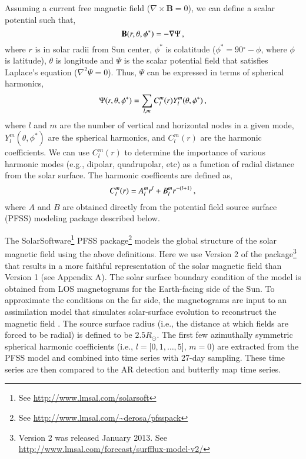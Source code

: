 \documentclass[namedreferences]{solarphysics}
\newcommand{\degr}{\ensuremath{^\circ}}
\begin{document}
\begin{article}
Assuming a current free magnetic field ($\nabla\times\mathbf{B}=0$), we can define a scalar potential such that,
\begin{equation}
\mathbf{B}(r,\theta,\phi^*)=-\nabla \Psi \mbox{\,,}
\end{equation}
where $r$ is in solar radii from Sun center, $\phi^*$ is colatitude ($\phi^*=90\degr-\phi$, where $\phi$ is latitude), $\theta$ is longitude and $\Psi$ is the scalar potential field 
that satisfies Laplace's equation ($\nabla^2 \Psi = 0$). Thus, $\Psi$ can be expressed in terms of spherical harmonics,
\begin{equation}\label{eqn_harm_coeff}
\Psi(r,\theta,\phi^*)=\sum_{l,m}C_{l}^{m}(r)Y_{l}^{m}(\theta,\phi^*) \mbox{\,,}
\end{equation}
where $l$ and $m$ are the number of vertical and horizontal nodes in a given mode, $Y_{l}^{m}(\theta,\phi^*)$ are the spherical harmonics, and $C_{l}^{m}(r)$ are the harmonic coefficients. We can use $C_{l}^{m}(r)$ to determine the importance of various harmonic modes (e.g., dipolar, quadrupolar, etc) as a function of radial distance from the solar surface. The harmonic coefficents are defined as,
\begin{equation}\label{eqn:harmcoeff}
C_{l}^{m}(r) = A^m_l r^l + B^m_l r^{-(l+1)} \mbox{\,,}
\end{equation}
where $A$ and $B$ are obtained directly from the potential field source surface (PFSS) modeling package described below. 

The SolarSoftware\footnote{See \url{http://www.lmsal.com/solarsoft}} \citep[SSW;][]{Freeland:1998} PFSS package\footnote{See \url{http://www.lmsal.com/~derosa/pfsspack}} \citep{Schrijver:2003} models the global structure of the solar magnetic field using the above definitions. Here we use Version 2 of the package\footnote{Version 2 was released January 2013. See \url{http://www.lmsal.com/forecast/surfflux-model-v2/}} that results in a more faithful representation of the solar magnetic field than Version 1 (see Appendix A).
The solar surface boundary condition of the model is obtained from LOS magnetograms for the Earth-facing side of the Sun. To approximate the conditions on the far side, the magnetograms are input to an assimilation model that simulates solar-surface evolution to reconstruct the magnetic field \citep{Schrijver:2003}. The source surface radius (i.e., the distance at which fields are forced to be radial) is defined to be $2.5R_{\odot}$. The first few azimuthally symmetric spherical harmonic coefficients (i.e., $l=[0, 1, \ldots, 5$], $m=0$) are extracted from the PFSS model and combined into time series with 27-day sampling. These time series are then compared to the AR detection and butterfly map time series.



\end{article}
\end{document}
